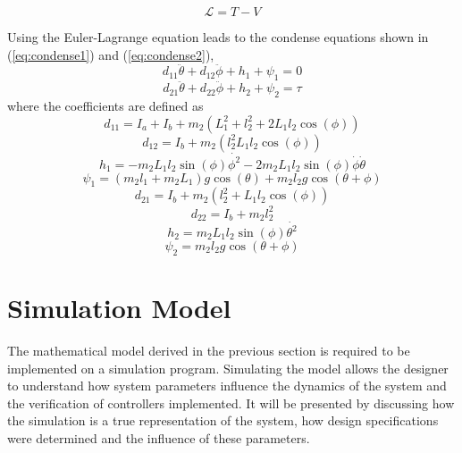 \begin{equation} \label{eq:euler_lagrane}
\mathcal{L}=T-V
\end{equation}

Using the Euler-Lagrange equation leads to the condense equations shown in (\ref{eq:condense1}) and (\ref{eq:condense2}),
\begin{equation} \label{eq:condense1}
d_{11}\ddot{\theta}+d_{12}\ddot{\phi} + h_{1} + \psi_{1} = 0
\end{equation}
\begin{equation} \label{eq:condense2}
d_{21}\ddot{\theta} + d_{22}\ddot{\phi} + h_{2} + \psi_{2} = \tau
\end{equation}
where the coefficients are defined as
\begin{equation} \label{eq:d11}
d_{11} = I_{a} + I_{b} + m_{2}(L_{1}^2 + l_{2}^2+2L_{1}l_{2}\cos(\phi))
\end{equation}
\begin{equation} \label{eq:d12}
d_{12} = I_{b} +m_{2}(l_{2}^2 L_{1}l_{2}\cos(\phi))
\end{equation}
\begin{equation} \label{eq:h1}
h_{1} = -m_{2}L_{1}l_{2}\sin(\phi)\dot{\phi^2}-2m_{2}L_{1}l_{2}\sin(\phi)\dot{\phi}\dot{\theta}
\end{equation}
\begin{equation} \label{eq:psi1}
\psi_{1} = (m_{2}l_{1}+m_{2}L_{1})g\cos(\theta) + m_{2}l_{2}g\cos(\theta+\phi)
\end{equation}
\begin{equation} \label{eq:d21}
d_{21}= I_{b}+m_{2}(l_{2}^2+L_{1}l_{2}\cos(\phi))
\end{equation}
\begin{equation} \label{eq:d22}
d_{22}= I_{b}+ m_{2}l_{2}^2
\end{equation}
\begin{equation} \label{eq:h2}
h_{2}= m_{2}L_{1}l_{2}\sin(\phi)\dot{\theta^2}
\end{equation}
\begin{equation} \label{eq:psi2}
\psi_{2}= m_{2}l_{2}g\cos(\theta+\phi)
\end{equation}

\section{Simulation Model}
The mathematical model derived in the previous section is required to be implemented on a simulation program. Simulating the model allows the designer to understand how system parameters influence the dynamics of the system and the verification of controllers implemented. It will be presented by discussing how the simulation is a true representation of the system, how design specifications were determined and the influence of these parameters.\\

